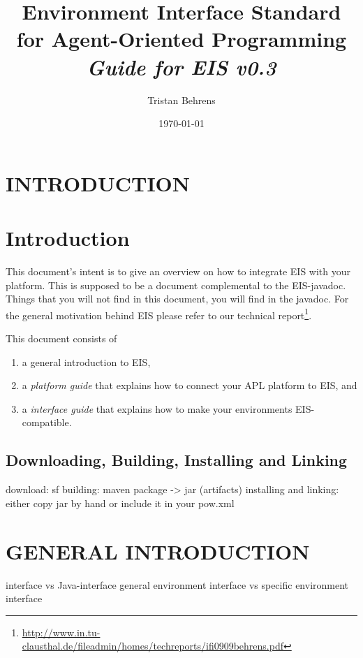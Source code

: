 \documentclass[a4]{article}
\newcommand{\EIS}{\textsf{EIS}\xspace}
\begin{document}
\title{Environment Interface Standard for Agent-Oriented Programming \\
\textit{Guide for EIS v0.3}
}

\author{Tristan Behrens}
\date{\today}

\maketitle

\section{INTRODUCTION}

\section{Introduction}

This document's intent is to give an overview on how to integrate \EIS with your platform. This is supposed to be a document complemental to the \EIS-javadoc. Things that you will not find
in this document, you will find in the javadoc. For the general motivation behind \EIS please refer
to our technical report\footnote{\url{http://www.in.tu-clausthal.de/fileadmin/homes/techreports/ifi0909behrens.pdf}}.


This document consists of
\begin{enumerate}
\item a general introduction to \EIS,
\item a \emph{platform guide} that explains how to connect your APL platform to \EIS, and
\item a \emph{interface guide} that explains how to make your environments \EIS-compatible.
\end{enumerate}

\subsection{Downloading, Building, Installing and Linking}

download: sf
building: maven package -> jar (artifacts)
installing and linking: either copy jar by hand or include it in your pow.xml

\section{GENERAL INTRODUCTION}

interface vs Java-interface
general environment interface vs specific environment interface
\end{document}
